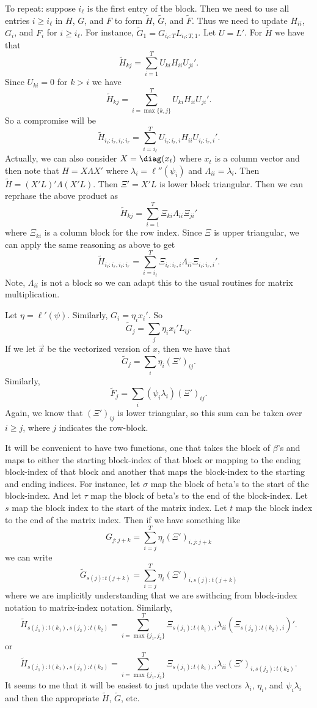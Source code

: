 \documentclass{article}
\begin{document}
To repeat: suppose $i_\ell$ is the first entry of the block.  Then we need to
use all entries $i \geq i_\ell$ in $H$, $G$, and $F$ to form $\tilde H$, $\tilde
G$, and $\tilde F$.  Thus we need to update $H_{ii}$, $G_i$, and $F_i$ for $i
\geq i_\ell$.  For instance, $\tilde G_1 = G_{i_\ell:T} L_{i_\ell:T,1}$.  Let $U
= L'$.  For $\tilde H$ we have that
\[
\tilde H_{kj} = \sum_{i=1}^T U_{ki} H_{ii} U_{ji}'.
\]
Since $U_{ki} = 0$ for $k > i$ we have
\[
\tilde H_{kj} = \sum_{i=\max\{k,j\}}^T U_{ki} H_{ii} U_{ji}'.
\]
So a compromise will be
\[
\tilde H_{i_\ell:i_r,i_\ell:i_r} = 
\sum_{i=i_\ell}^T U_{i_\ell:i_r,i} H_{ii} U_{i_\ell:i_r,i}'.
\]
Actually, we can also consider $X = \diag(x_t)$ where $x_t$ is a column vector
and then note that $H = X \Lambda X'$ where $\lambda_{i} = \ell''(\psi_i)$ and
$\Lambda_{ii} = \lambda_i$.  Then $\tilde H = (X'L)' \Lambda (X'L)$.  Then $\Xi'
= X'L$ is lower block triangular.  Then we can reprhase the above product as
\[
\tilde H_{kj} = \sum_{i=1}^T \Xi_{ki} \Lambda_{ii} \Xi_{ji}'
\]
where $\Xi_{ki}$ is a column block for the row index.  Since $\Xi$ is upper
triangular, we can apply the same reasoning as above to get
\[
\tilde H_{i_\ell:i_r,i_\ell:i_r} = \sum_{i=i_\ell}^T \Xi_{i_\ell:i_r,i} \Lambda_{ii} \Xi_{i_\ell:i_r,i}'.
\]
Note, $\Lambda_{ii}$ is not a block so we can adapt this to the usual routines
for matrix multiplication.

Let $\eta = \ell'(\psi)$.  Similarly, $G_i = \eta_i x_i'$.  So 
\[
\tilde G_j = \sum_j \eta_i x_i' L_{ij}.
\]
If we let $\vec{x}$ be the vectorized version of $x$, then we have that
\[
\tilde G_j = \sum_i \eta_i (\Xi')_{ij}.
\]
Similarly,
\[
\tilde F_j = \sum_{i} (\psi_i \lambda_i) (\Xi')_{ij}.
\]
Again, we know that $(\Xi')_{ij}$ is lower triangular, so this sum can be taken
over $i \geq j$, where $j$ indicates the row-block.

It will be convenient to have two functions, one that takes the block of
$\beta$'s and maps to either the starting block-index of that block or mapping
to the ending block-index of that block and another that maps the block-index to
the starting and ending indices.  For instance, let $\sigma$ map the block of
beta's to the start of the block-index.  And let $\tau$ map the block of beta's
to the end of the block-index.  Let $s$ map the block index to the start of the
matrix index.  Let $t$ map the block index to the end of the matrix index.  Then
if we have something like
\[
G_{j:j+k} = \sum_{i=j}^T \eta_i (\Xi')_{i,j:j+k}
\]
we can write
\[
\tilde G_{s(j):t(j+k)} = \sum_{i=j}^T \eta_i (\Xi')_{i,s(j):t(j+k)}
\]
where we are implicitly understanding that we are swithcing from block-index
notation to matrix-index notation.  Similarly,
\[
\tilde H_{s(j_1):t(k_1),s(j_2):t(k_2)} 
= \sum_{i=\max\{j_1, j_2\}}^T \Xi_{s(j_1):t(k_1),i} \lambda_{ii} (\Xi_{s(j_2):t(k_2),i})'.
\]
or
\[
\tilde H_{s(j_1):t(k_1),s(j_2):t(k_2)} 
= \sum_{i=\max\{j_1, j_2\}}^T \Xi_{s(j_1):t(k_1),i} \lambda_{ii} (\Xi')_{i,s(j_2):t(k_2)}.
\]
It seems to me that it will be easiest to just update the vectors $\lambda_i$,
$\eta_i$, and $\psi_i \lambda_i$ and then the appropriate $\tilde H$, $\tilde
G$, etc.
\end{document}
